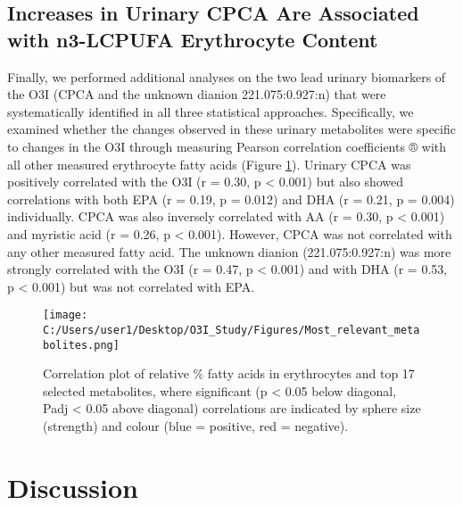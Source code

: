 \documentclass[journal=jacsat,manuscript=article]{achemso}
\begin{document}
\subsection{Increases in Urinary CPCA Are Associated with n3-LCPUFA
Erythrocyte
Content}\label{increases-in-urinary-cpca-are-associated-with-n3-lcpufa-erythrocyte-content}

Finally, we performed additional analyses on the two lead urinary
biomarkers of the O3I (CPCA and the unknown dianion 221.075:0.927:n)
that were systematically identified in all three statistical approaches.
Specifically, we examined whether the changes observed in these urinary
metabolites were specific to changes in the O3I through measuring
Pearson correlation coefficients ® with all other measured erythrocyte
fatty acids (Figure \ref{fig:fig4}). Urinary CPCA was positively
correlated with the O3I (r = 0.30, p \textless{} 0.001) but also showed
correlations with both EPA (r = 0.19, p = 0.012) and DHA (r = 0.21, p =
0.004) individually. CPCA was also inversely correlated with AA (r =
0.30, p \textless{} 0.001) and myristic acid (r = 0.26, p \textless{}
0.001). However, CPCA was not correlated with any other measured fatty
acid. The unknown dianion (221.075:0.927:n) was more strongly correlated
with the O3I (r = 0.47, p \textless{} 0.001) and with DHA (r = 0.53, p
\textless{} 0.001) but was not correlated with EPA.

\begin{figure}
\centering
\texttt{[image: C:/Users/user1/Desktop/O3I\_Study/Figures/Most\_relevant\_metabolites.png]}
\caption{Correlation plot of relative \% fatty acids in erythrocytes and
top 17 selected metabolites, where significant (p \textless{} 0.05 below
diagonal, Padj \textless{} 0.05 above diagonal) correlations are
indicated by sphere size (strength) and colour (blue = positive, red =
negative). \label{fig4}}\label{fig:fig4}
\end{figure}

\section{Discussion}\label{discussion}
\end{document}
